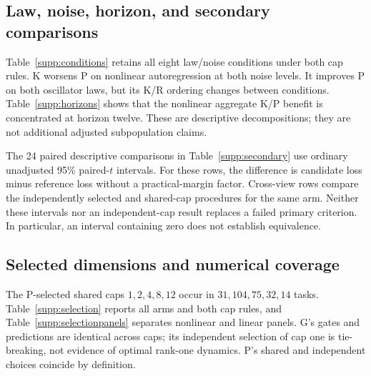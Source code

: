 \subsection{Law, noise, horizon, and secondary comparisons}
Table~\ref{supp:conditions} retains all eight law/noise conditions under both cap rules. K worsens P on nonlinear autoregression at both noise levels. It improves P on both oscillator laws, but its K/R ordering changes between conditions. Table~\ref{supp:horizons} shows that the nonlinear aggregate K/P benefit is concentrated at horizon twelve. These are descriptive decompositions; they are not additional adjusted subpopulation claims.

The 24 paired descriptive comparisons in Table~\ref{supp:secondary} use ordinary unadjusted 95\% paired-$t$ intervals. For these rows, the difference is candidate loss minus reference loss without a practical-margin factor. Cross-view rows compare the independently selected and shared-cap procedures for the same arm. Neither these intervals nor an independent-cap result replaces a failed primary criterion. In particular, an interval containing zero does not establish equivalence.

\begin{table}[htbp]\centering\small
\caption{Complete descriptive law/noise means over 32 repetitions and three horizons. AR denotes autoregression. The parameter $\eta$ is the added-noise multiplier; oscillator sensor noise is present even at $\eta=0$.}\label{supp:conditions}
\end{table}
\begin{table}[htbp]\centering\small
\caption{Horizon-specific descriptive SMSE. NL and L denote nonlinear and linear panels. Each horizon has a separate fitted direct readout and its own A target-variance normalization.}\label{supp:horizons}
\end{table}
\begin{table}[htbp]\centering\small
\caption{All planned descriptive paired comparisons. Ordinary 95\% intervals are unadjusted. The difference $\bar\Delta$ is candidate minus reference in absolute SMSE units. Cross-view comparisons use independent minus shared cap selection.}\label{supp:secondary}
\end{table}
\FloatBarrier

\subsection{Selected dimensions and numerical coverage}
The P-selected shared caps $1,2,4,8,12$ occur in $31,104,75,32,14$ tasks. Table~\ref{supp:selection} reports all arms and both cap rules, and Table~\ref{supp:selectionpanels} separates nonlinear and linear panels. G's gates and predictions are identical across caps; its independent selection of cap one is tie-breaking, not evidence of optimal rank-one dynamics. P's shared and independent choices coincide by definition.

